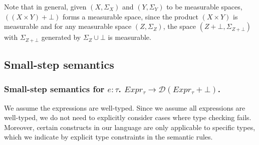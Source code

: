Note that in general, given $(X, \Sigma_X)$ and $(Y, \Sigma_Y)$ to be measurable spaces, $((X \times Y) + \bot)$ forms a measurable space, since the product $(X \times Y)$ is measurable and for any measurable space $(Z, \Sigma_Z)$, the space $(Z + \bot, \Sigma_{Z + \bot})$ with $\Sigma_{Z + \bot}$ generated by $\Sigma_Z \cup {{\bot}}$ is measurable. 


\subsection{Small-step semantics}

\subsubsection{Small-step semantics for $e : \tau$. $Expr_{\tau} \to \mathcal{D}(Expr_{\tau} + \bot)$.}
We assume the expressions are well-typed. Since we assume all expressions are well-typed, we do not need to explicitly consider cases where type checking fails. Moreover, certain constructs in our language are only applicable to specific types, which we indicate by explicit type constraints in the semantic rules.
